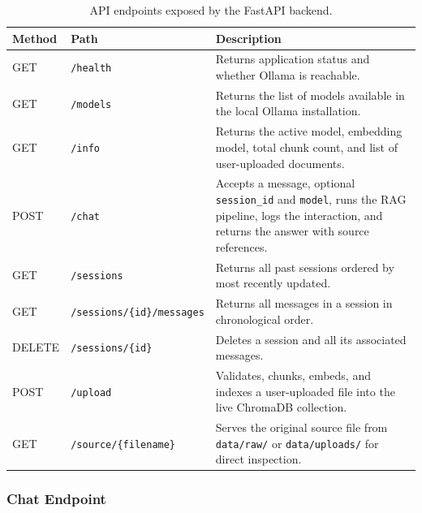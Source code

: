 \begin{table}[H]
    \centering
    \begin{tabular}{|l|l|p{}|}
        \hline
        \textbf{Method} & \textbf{Path} & \textbf{Description} \\
        \hline \hline
        GET    & \texttt{/health}
               & Returns application status and whether Ollama is reachable. \\
        \hline
        GET    & \texttt{/models}
               & Returns the list of models available in the local Ollama
                 installation. \\
        \hline
        GET    & \texttt{/info}
               & Returns the active model, embedding model, total chunk count,
                 and list of user-uploaded documents. \\
        \hline
        POST   & \texttt{/chat}
               & Accepts a message, optional \texttt{session\_id} and
                 \texttt{model}, runs the RAG pipeline, logs the interaction,
                 and returns the answer with source references. \\
        \hline
        GET    & \texttt{/sessions}
               & Returns all past sessions ordered by most recently updated. \\
        \hline
        GET    & \texttt{/sessions/\{id\}/messages}
               & Returns all messages in a session in chronological order. \\
        \hline
        DELETE & \texttt{/sessions/\{id\}}
               & Deletes a session and all its associated messages. \\
        \hline
        POST   & \texttt{/upload}
               & Validates, chunks, embeds, and indexes a user-uploaded file
                 into the live ChromaDB collection. \\
        \hline
        GET    & \texttt{/source/\{filename\}}
               & Serves the original source file from \texttt{data/raw/} or
                 \texttt{data/uploads/} for direct inspection. \\
        \hline
    \end{tabular}
    \caption{API endpoints exposed by the FastAPI backend.}
    \label{tab:endpoints}
\end{table}

\subsubsection{Chat Endpoint}

